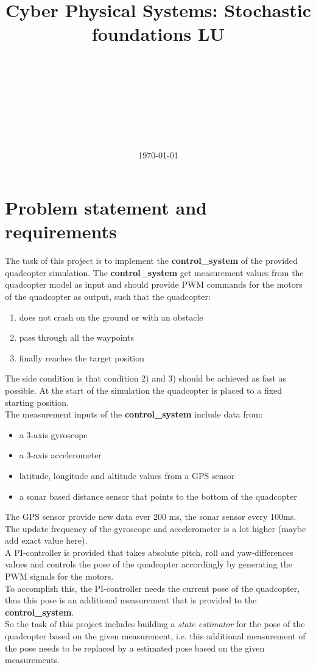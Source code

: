 \documentclass[a4paper,footsepline]{scrartcl}
\title{Cyber Physical Systems: Stochastic foundations LU}
\author{
	\authorname{Mathias Lechner, Benjamin Binder} \\
	\authorname{Johannes Obermüller, Lukas Hartung} \\
	\studentnumber{1225134, 1226121, 1126799} \\
	\curriculum{066 938}\\
	\email{e1225134@student.tuwien.ac.at, e1226121@student.tuwien.ac.at}\\
	\email{e1126799@student.tuwien.ac.at}\\\\
}
\date{\today}
\begin{document}
\maketitle
\section*{Problem statement and requirements}
The task of this project is to implement the \textbf{control\_system} of the provided quadcopter simulation. The \textbf{control\_system} get measurement values from the quadcopter model as input and should provide PWM commands for the motors of the quadcopter as output, such that the quadcopter:
\begin{enumerate}
	\item does not crash on the ground or with an obstacle
	\item pass through all the waypoints
	\item finally reaches the target position
\end{enumerate}
The side condition is that condition 2) and 3) should be achieved as fast as possible. At the start of the simulation the quadcopter is placed to a fixed starting position.
\vspace{0.2cm}\\
The measurement inputs of the \textbf{control\_system} include data from:
\begin{itemize}
	\item a 3-axis gyroscope
	\item a 3-axis accelerometer
	\item latitude, longitude and altitude values from a GPS sensor
	\item a sonar based distance sensor that points to the bottom of the quadcopter
\end{itemize}
The GPS sensor provide new data ever 200 ms, the sonar sensor every 100ms. The update frequency of the gyroscope and accelerometer is a lot higher (maybe add exact value here).
\vspace{0.2cm}\\
A PI-controller is provided that takes absolute pitch, roll and yaw-differences values and controls the pose of the quadcopter accordingly by generating the PWM signals for the motors. \\
To accomplish this, the PI-controller needs the current pose of the quadcopter, thus this pose is an additional measurement that is provided to the \textbf{control\_system}. \\
So the task of this project includes building a \emph{state estimator} for the pose of the quadcopter based on the given measurement, i.e. this additional measurement of the pose needs to be replaced by a estimated pose based on the given measurements.
\FloatBarrier
\end{document}
